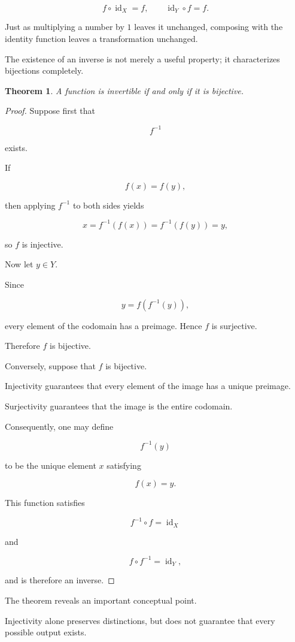 \documentclass[11pt]{book}
\numberwithin{equation}{chapter}
\theoremstyle{definition}
\theoremstyle{plain}
\newtheorem{theorem}[definition]{Theorem}
\theoremstyle{remark}
\DeclareMathOperator{\id}{id}
\begin{document}
\[
f\circ\id_X=f,
\qquad
\id_Y\circ f=f.
\]

Just as multiplying a number by \(1\) leaves it unchanged, composing with the identity function leaves a transformation unchanged.

The existence of an inverse is not merely a useful property; it characterizes bijections completely.

\begin{theorem}
A function is invertible if and only if it is bijective.
\end{theorem}

\begin{proof}
Suppose first that

\[
f^{-1}
\]

exists.

If

\[
f(x)=f(y),
\]

then applying \(f^{-1}\) to both sides yields

\[
x
=
f^{-1}(f(x))
=
f^{-1}(f(y))
=
y,
\]

so \(f\) is injective.

Now let \(y\in Y\).

Since

\[
y=f(f^{-1}(y)),
\]

every element of the codomain has a preimage. Hence \(f\) is surjective.

Therefore \(f\) is bijective.

Conversely, suppose that \(f\) is bijective.

Injectivity guarantees that every element of the image has a unique preimage.

Surjectivity guarantees that the image is the entire codomain.

Consequently, one may define

\[
f^{-1}(y)
\]

to be the unique element \(x\) satisfying

\[
f(x)=y.
\]

This function satisfies

\[
f^{-1}\circ f=\id_X
\]

and

\[
f\circ f^{-1}=\id_Y,
\]

and is therefore an inverse.
\end{proof}

The theorem reveals an important conceptual point.

Injectivity alone preserves distinctions, but does not guarantee that every possible output exists.
\end{document}
